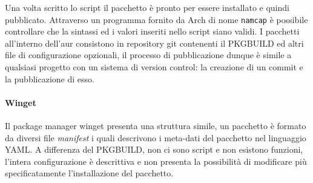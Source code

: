 Una volta scritto lo script il pacchetto è pronto per essere installato e quindi pubblicato. Attraverso un programma fornito da Arch di nome \texttt{namcap} è possibile controllare che la sintassi ed i valori inseriti nello script siano validi. I pacchetti all'interno dell'\ac{aur} consistono in repository git contenenti il PKGBUILD ed altri file di configurazione opzionali, il processo di pubblicazione dunque è simile a qualsiasi progetto con un sistema di version control: la creazione di un commit e la pubblicazione di esso.

\paragraph{Winget} Il package manager winget presenta una struttura simile, un pacchetto è formato da diversi file \textit{manifest} i quali descrivono i meta-dati del pacchetto nel linguaggio YAML. A differenza del PKGBUILD, non ci sono script e non esistono funzioni, l'intera configurazione è descrittiva e non presenta la possibilità di modificare più specificatamente l'installazione del pacchetto.

